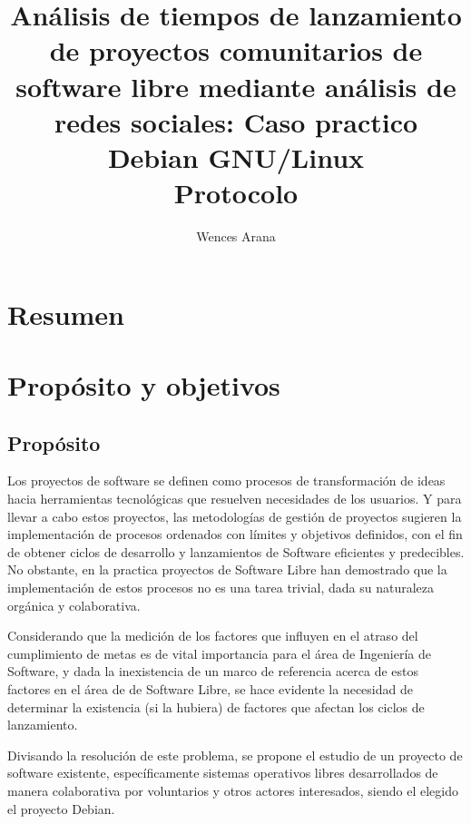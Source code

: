 \documentclass[12pt]{report}
\begin{document}
  \title{ {Análisis  de  tiempos  de  lanzamiento  de
proyectos comunitarios  de software  libre mediante análisis  de redes
sociales:   Caso   practico    Debian   GNU/Linux}
\\   {Protocolo}   }
\author{Wences Arana}
\maketitle

\tableofcontents

\chapter*{Resumen}

\chapter*{Propósito y objetivos}

\section*{Propósito} %
Los proyectos de  software se definen como  procesos de transformación
de ideas hacia herramientas  tecnológicas que resuelven necesidades de
los usuarios. Y  para llevar a cabo estos  proyectos, las metodologías
de  gestión  de  proyectos  sugieren  la  implementación  de  procesos
ordenados con  límites y  objetivos definidos, con  el fin  de obtener
ciclos  de   desarrollo  y  lanzamientos  de   Software  eficientes  y
predecibles.  No obstante, en la  practica proyectos de Software Libre
han demostrado que la implementación de estos procesos no es una tarea
trivial, dada su naturaleza orgánica y colaborativa.

Considerando que la medición de los factores que influyen en el atraso
del cumplimiento  de metas  es de  vital importancia  para el  área de
Ingeniería  de  Software,  y  dada  la inexistencia  de  un  marco  de
referencia acerca de  estos factores en el área de  de Software Libre,
se  hace evidente  la necesidad  de  determinar la  existencia (si  la
hubiera) de factores que afectan los ciclos de lanzamiento.


Divisando la resolución de este problema,  se propone el estudio de un
proyecto  de software  existente, específicamente  sistemas operativos
libres desarrollados  de manera  colaborativa por voluntarios  y otros
actores interesados, siendo el elegido el proyecto Debian.
\end{document}
